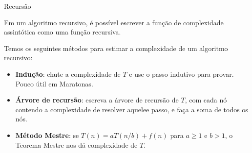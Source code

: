 \begin{frame}{Recursão}

    Em um algoritmo recursivo, é possível escrever a função de complexidade assintótica como uma função recursiva. \pause

    Temos os seguintes métodos para estimar a complexidade de um algoritmo recursivo:

    \begin{itemize} \pause
        \item[(i)] {\bf Indução}: chute a complexidade de $T$ e use o passo indutivo para provar. Pouco útil em Maratonas. \pause
        
        \item[(ii)] {\bf Árvore de recursão}: escreva a árvore de recursão de $T$, com cada nó contendo a complexidade de resolver aquelee passo, e faça a soma de todos os nós. \pause
        
        \item[(iii)] {\bf Método Mestre}: se $T(n) = aT(n/b) + f(n)$ para $a \geq 1$ e $b > 1$, o Teorema Mestre nos dá complexidade de $T$.
    \end{itemize}

\end{frame}

